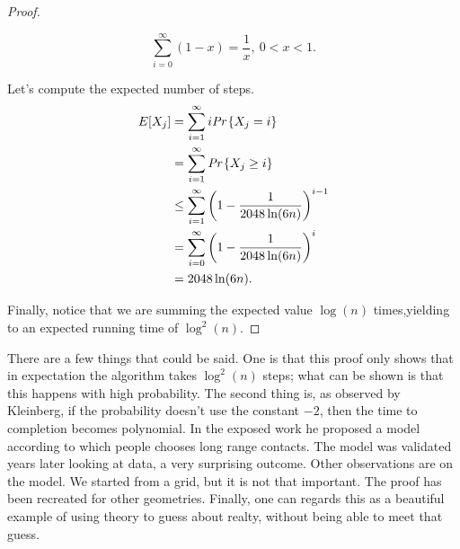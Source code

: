 \begin{proof}
\begin{obs}
	\begin{equation}
	\sum_{i=0}^\infty(1-x) = \frac{1}{x},\ 0 < x <1.
	\end{equation}
\end{obs}

Let's compute the expected number of steps.
\begin{align}
E[X_j] &= \sum_{i = 1}^\infty i\emph{Pr}\left\{X_j = i\right\}\\
&=\sum_{i = 1}^\infty\emph{Pr}\left\{X_j \geq i\right\}\\
&\leq \sum_{i = 1}^\infty\left(1 - \frac{1}{2048\ln(6n)}\right)^{i-1}\\
&=\sum_{i = 0}^\infty\left(1 - \frac{1}{2048\ln(6n)}\right)^{i}\\
&=2048\ln(6n).
\end{align}

Finally, notice that we are summing the expected value $\log(n)$ times,yielding to an expected running time of $\log^2(n)$.

\end{proof}

There are a few things that could be said. One is that this proof only shows that in expectation the algorithm takes $\log^2(n)$ steps; what can be shown is that this happens with high probability. The second thing is, as observed by Kleinberg, if the probability doesn't use the constant $-2$, then the time to completion becomes polynomial. In the exposed work he proposed a model according to which people chooses long range contacts. The model was validated years later looking at data, a very surprising outcome. Other observations are on the model. We started from a grid, but it is not that important. The proof has been recreated for other geometries. Finally, one can regards this as a beautiful example of using theory to guess about realty, without being able to meet that guess.

